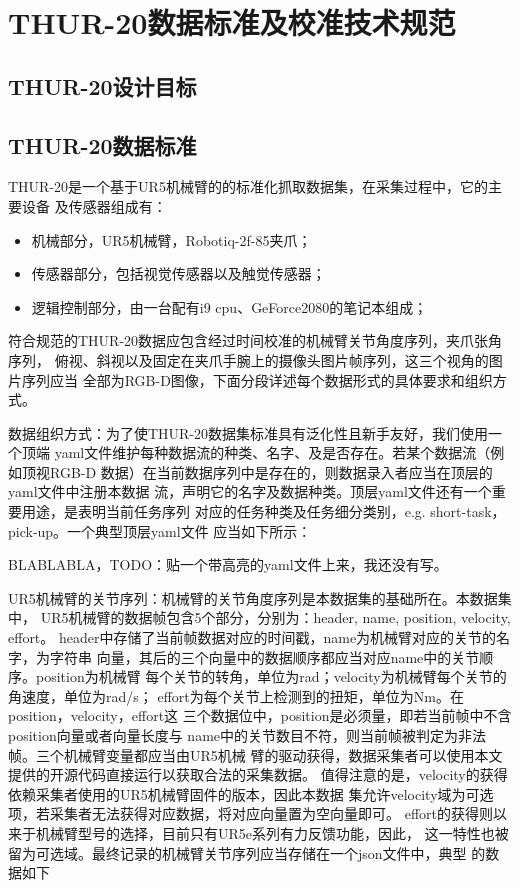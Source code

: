 
\chapter{THUR-20数据标准及校准技术规范}
\label{cha:chapter02}

\section{THUR-20设计目标}

\section{THUR-20数据标准}
\label{sec:standard}

  THUR-20是一个基于UR5机械臂的的标准化抓取数据集，在采集过程中，它的主要设备
  及传感器组成有：

  \begin{itemize}
    \item 机械部分，UR5机械臂，Robotiq-2f-85夹爪；
    \item 传感器部分，包括视觉传感器以及触觉传感器；
    \item 逻辑控制部分，由一台配有i9 cpu、GeForce2080的笔记本组成；
  \end{itemize}

  符合规范的THUR-20数据应包含经过时间校准的机械臂关节角度序列，夹爪张角序列，
  俯视、斜视以及固定在夹爪手腕上的摄像头图片帧序列，这三个视角的图片序列应当
  全部为RGB-D图像，下面分段详述每个数据形式的具体要求和组织方式。

  数据组织方式：为了使THUR-20数据集标准具有泛化性且新手友好，我们使用一个顶端
  yaml文件维护每种数据流的种类、名字、及是否存在。若某个数据流（例如顶视RGB-D
  数据）在当前数据序列中是存在的，则数据录入者应当在顶层的yaml文件中注册本数据
  流，声明它的名字及数据种类。顶层yaml文件还有一个重要用途，是表明当前任务序列
  对应的任务种类及任务细分类别，e.g. short-task，pick-up。一个典型顶层yaml文件
  应当如下所示：

  BLABLABLA，TODO：贴一个带高亮的yaml文件上来，我还没有写。

  UR5机械臂的关节序列：机械臂的关节角度序列是本数据集的基础所在。本数据集中，
  UR5机械臂的数据帧包含5个部分，分别为：header, name, position, velocity, effort。
  header中存储了当前帧数据对应的时间戳，name为机械臂对应的关节的名字，为字符串
  向量，其后的三个向量中的数据顺序都应当对应name中的关节顺序。position为机械臂
  每个关节的转角，单位为rad；velocity为机械臂每个关节的角速度，单位为rad/s；
  effort为每个关节上检测到的扭矩，单位为Nm。在position，velocity，effort这
  三个数据位中，position是必须量，即若当前帧中不含position向量或者向量长度与
  name中的关节数目不符，则当前帧被判定为非法帧。三个机械臂变量都应当由UR5机械
  臂的驱动获得，数据采集者可以使用本文提供的开源代码直接运行以获取合法的采集数据。
  值得注意的是，velocity的获得依赖采集者使用的UR5机械臂固件的版本，因此本数据
  集允许velocity域为可选项，若采集者无法获得对应数据，将对应向量置为空向量即可。
  effort的获得则以来于机械臂型号的选择，目前只有UR5e系列有力反馈功能，因此，
  这一特性也被留为可选域。最终记录的机械臂关节序列应当存储在一个json文件中，典型
  的数据如下

